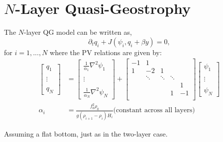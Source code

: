\documentclass[12pt]{article}
\begin{document}
\newpage
\section{$N$-Layer Quasi-Geostrophy}{
    The $N$-layer QG model can be written as,
    $$
    \partial_t q_i + J(\psi_i, q_i + \beta y) = 0,
    $$
    for $i=1,...,N$ where the PV relations are given by:
    \begin{align*}
        \left[\begin{array}{c}
        q_1 \\
        \\
        \vdots \\
        \\
        q_N
        \end{array}\right]
        &=
        \left[\begin{array}{c}
        \frac{1}{\alpha_1}\nabla^2 \psi_1 \\
        \\
        \vdots \\
        \\
        \frac{1}{\alpha_N}\nabla^2 \psi_N
        \end{array}\right]
        +
        \left[\begin{array}{ccccc}
        -1 & 1 & & & \\
        1 & -2 & 1 & & \\
        & \ddots & \ddots & \ddots & \\
        & & & & 1 \\
        & & & 1 & -1\\
        \end{array}\right]
        \left[\begin{array}{c}
        \psi_1 \\
        \\
        \vdots \\
        \\
        \psi_N
        \end{array}\right] \\
        \alpha_i &= \frac{f_0^2 \rho_0}{g (\rho_{i+1} - \rho_i) H_i} \text{(constant across all layers)}
    \end{align*}

    Assuming a flat bottom, just as in the two-layer case.

}
\end{document}
